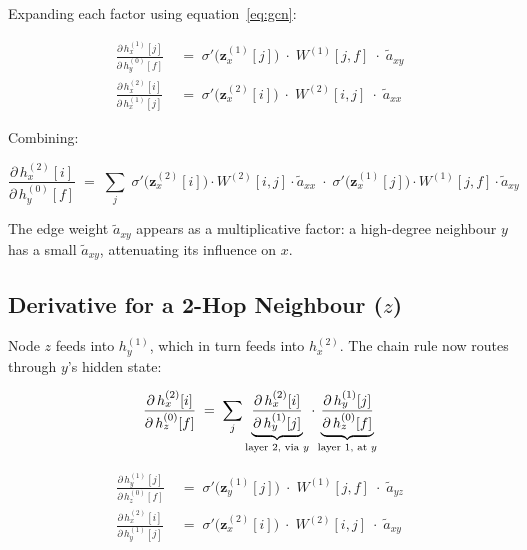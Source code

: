\documentclass[11pt]{article}
\begin{document}
Expanding each factor using equation~\eqref{eq:gcn}:

\begin{align}
  \frac{\partial\, h_x^{(1)}[j]}{\partial\, h_y^{(0)}[f]}
  &\;=\;
  \sigma'\!\bigl(\mathbf{z}_x^{(1)}[j]\bigr)
  \;\cdot\;
  W^{(1)}[j,f]
  \;\cdot\;
  \tilde{a}_{xy}
  \\[6pt]
  \frac{\partial\, h_x^{(2)}[i]}{\partial\, h_x^{(1)}[j]}
  &\;=\;
  \sigma'\!\bigl(\mathbf{z}_x^{(2)}[i]\bigr)
  \;\cdot\;
  W^{(2)}[i,j]
  \;\cdot\;
  \tilde{a}_{xx}
\end{align}

Combining:

\begin{equation}
  \boxed{
  \frac{\partial\, h_x^{(2)}[i]}{\partial\, h_y^{(0)}[f]}
  \;=\;
  \sum_j\;
  \sigma'\!\bigl(\mathbf{z}_x^{(2)}[i]\bigr)\cdot W^{(2)}[i,j]\cdot\tilde{a}_{xx}
  \;\cdot\;
  \sigma'\!\bigl(\mathbf{z}_x^{(1)}[j]\bigr)\cdot W^{(1)}[j,f]\cdot\tilde{a}_{xy}
  }
\end{equation}

\medskip
The edge weight $\tilde{a}_{xy}$ appears as a multiplicative factor: a
high-degree neighbour $y$ has a small $\tilde{a}_{xy}$, attenuating its
influence on $x$.

\subsection{Derivative for a 2-Hop Neighbour ($z$)}

Node $z$ feeds into $h_y^{(1)}$, which in turn feeds into $h_x^{(2)}$.
The chain rule now routes through $y$'s hidden state:

\begin{equation}
  \frac{\partial\, h_x^{(2)}[i]}{\partial\, h_z^{(0)}[f]}
  \;=\;
  \sum_j
  \underbrace{%
    \frac{\partial\, h_x^{(2)}[i]}{\partial\, h_y^{(1)}[j]}
  }_{\text{layer 2, via }y}
  \cdot
  \underbrace{%
    \frac{\partial\, h_y^{(1)}[j]}{\partial\, h_z^{(0)}[f]}
  }_{\text{layer 1, at }y}
\end{equation}

\begin{align}
  \frac{\partial\, h_y^{(1)}[j]}{\partial\, h_z^{(0)}[f]}
  &\;=\;
  \sigma'\!\bigl(\mathbf{z}_y^{(1)}[j]\bigr)
  \;\cdot\;
  W^{(1)}[j,f]
  \;\cdot\;
  \tilde{a}_{yz}
  \\[6pt]
  \frac{\partial\, h_x^{(2)}[i]}{\partial\, h_y^{(1)}[j]}
  &\;=\;
  \sigma'\!\bigl(\mathbf{z}_x^{(2)}[i]\bigr)
  \;\cdot\;
  W^{(2)}[i,j]
  \;\cdot\;
  \tilde{a}_{xy}
\end{align}
\end{document}
